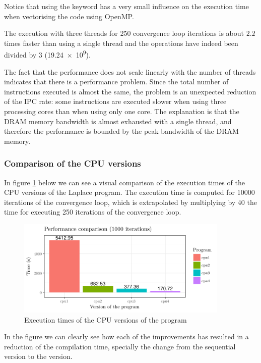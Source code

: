 Notice that using the  keyword has a very small influence on the execution time when vectorising the code using OpenMP.

The execution with three threads for 250 convergence loop iterations is about $2.2$ times faster than using a single thread and the operations have indeed been divided by 3 (\num{19.24e9}).

The fact that the performance does not scale linearly with the number of threads indicates that there is a performance problem. Since the total number of instructions executed is almost the same, the problem is an unexpected reduction of the IPC rate: some instructions are executed slower when using three processing cores than when using only one core. The explanation is that the DRAM memory bandwidth is almost exhausted with a single thread, and therefore the performance is bounded by the peak bandwidth of the DRAM memory.

\subsubsection{Comparison of the CPU versions}
In figure \ref{fig:times-cpu} below we can see a visual comparison of the execution times of the CPU versions of the Laplace program. The execution time is computed for \num{10000} iterations of the convergence loop, which is extrapolated by multiplying by 40 the time for executing 250 iterations of the convergence loop.
\begin{figure}[H]
	\centering
	\includegraphics[width=0.9\textwidth]{images/times-cpu}
	\caption{Execution times of the CPU versions of the program}
	\label{fig:times-cpu}
\end{figure}

In the figure we can clearly see how each of the improvements has resulted in a reduction of the compilation time, specially the change from the sequential  version to the  version.

